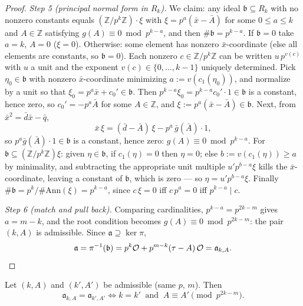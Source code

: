 \begin{proof}
  \emph{Step 5 (principal normal form in $R_k$).} We claim: any ideal
  $\mathfrak{b} \subseteq R_k$ with no nonzero constants equals
  $(\mathbb{Z}/p^k\mathbb{Z})\cdot\xi$ with $\xi = p^a(\bar x - \bar A)$ for some
  $0 \le a \le k$ and $A \in \mathbb{Z}$ satisfying $g(A) \equiv 0 \bmod p^{k-a}$,
  and then $\#\mathfrak{b} = p^{k-a}$. If $\mathfrak{b} = 0$ take $a = k$, $A = 0$
  ($\xi = 0$). Otherwise: some element has nonzero $\bar x$-coordinate (else all
  elements are constants, so $\mathfrak{b} = 0$). Each nonzero
  $c \in \mathbb{Z}/p^k\mathbb{Z}$ can be written $u\,p^{v(c)}$ with $u$ a unit
  and the exponent $v(c) \in \{0, \dots, k-1\}$ uniquely determined. Pick
  $\eta_0 \in \mathfrak{b}$ with nonzero
  $\bar x$-coordinate minimizing $a := v(c_1(\eta_0))$, and normalize by a unit so
  that $\xi_0 = p^a\bar x + c_0' \in \mathfrak{b}$. Then
  $p^{k-a}\xi_0 = p^{k-a}c_0'\cdot 1 \in \mathfrak{b}$ is a constant, hence zero,
  so $c_0' = -p^a\bar A$ for some $A \in \mathbb{Z}$, and
  $\xi := p^a(\bar x - \bar A) \in \mathfrak{b}$. Next, from
  $\bar x^2 = \bar d\bar x - \bar q$,
  \[
    \bar x\,\xi = (\bar d - \bar A)\,\xi - p^a\,\bar g(\bar A)\cdot 1,
  \]
  so $p^a \bar g(\bar A)\cdot 1 \in \mathfrak{b}$ is a constant, hence zero:
  $g(A) \equiv 0 \bmod p^{k-a}$. For $\mathfrak{b} \subseteq
  (\mathbb{Z}/p^k\mathbb{Z})\xi$: given $\eta \in \mathfrak{b}$, if
  $c_1(\eta) = 0$ then $\eta = 0$; else $b := v(c_1(\eta)) \ge a$ by minimality,
  and subtracting the appropriate unit multiple $u'p^{b-a}\xi$ kills the
  $\bar x$-coordinate, leaving a constant of $\mathfrak{b}$, which is zero — so
  $\eta = u'p^{b-a}\xi$. Finally
  $\#\mathfrak{b} = p^k/\#\mathrm{Ann}(\xi) = p^{k-a}$, since $c\,\xi = 0$ iff
  $c\,p^a = 0$ iff $p^{k-a} \mid c$.

  \emph{Step 6 (match and pull back).} Comparing cardinalities,
  $p^{k-a} = p^{2k-m}$ gives $a = m - k$, and the root condition becomes
  $g(A) \equiv 0 \bmod p^{2k-m}$: the pair $(k, A)$ is admissible. Since
  $\mathfrak{a} \supseteq \ker\pi$,
  \[
    \mathfrak{a} = \pi^{-1}(\mathfrak{b})
     = p^k\mathcal{O} + p^{m-k}(\tau - A)\,\mathcal{O}
     = \mathfrak{a}_{k,A}. \qedhere
  \]
\end{proof}

\begin{proposition}
  \label{lem-3-2-4-inj}
  Let $(k, A)$ and $(k', A')$ be admissible (same $p$, $m$). Then
  \[
    \mathfrak{a}_{k,A} = \mathfrak{a}_{k',A'}
    \iff
    k = k' \ \text{ and } \ A \equiv A' \pmod{p^{2k-m}}.
  \]
\end{proposition}

